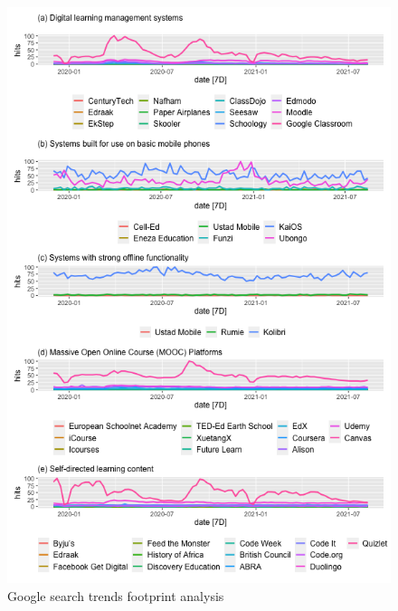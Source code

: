 \documentclass[11pt,a4paper,]{article}
\begin{document}
\begin{figure}[h]

{\centering \includegraphics[width=1\textwidth]{figure/plot1-1} 

}

\caption{Google search trends footprint analysis}\label{fig:plot1}
\end{figure}
\end{document}
